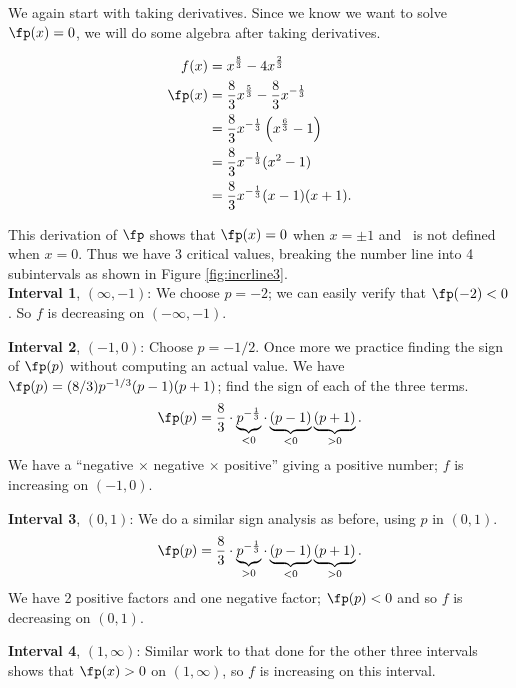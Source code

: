 {We again start with taking derivatives. Since we know we want to solve $\fp(x) = 0$, we will do some algebra after taking derivatives.

\begin{align*}
f(x) &= x^{\frac{8}{3}}-4x^{\frac{2}{3}} \\
\fp(x) &= \frac83 x^{\frac53} - \frac83x^{-\frac13}\\
	&= \frac83x^{-\frac13}\left(x^{\frac63}-1\right)\\
	&=\frac83x^{-\frac13}(x^2-1)\\
	&=\frac83x^{-\frac13}(x-1)(x+1).
\end{align*}

This derivation of $\fp$ shows that $\fp(x) = 0$ when $x=\pm 1$ and \fp\ is not defined when $x=0$. Thus we have 3 critical values, breaking the number line into 4 subintervals as shown in Figure \ref{fig:incrline3}.\\


\noindent\textbf{Interval 1}, $(\infty,-1)$: We choose $p=-2$; we can easily verify that $\fp(-2)<0$. So $f$ is decreasing on $(-\infty,-1)$.

\noindent\textbf{Interval 2}, $(-1,0)$: Choose $p=-1/2$. Once more we practice finding the sign of $\fp(p)$ without computing an actual value. We have $\fp(p) = (8/3)p^{-1/3}(p-1)(p+1)$; find the sign of each of the three terms. 
		$$\fp(p) = \frac 83 \cdot \underbrace{p^{-\frac13}}_{<0}\cdot \underbrace{(p-1)}_{<0}\underbrace{(p+1)}_{>0}.$$
		We have a ``negative $\times$ negative $\times$ positive'' giving a positive number; $f$ is increasing on $(-1,0)$.
		
\noindent\textbf{Interval 3}, $(0,1)$: We do a similar sign analysis as before, using $p$ in $(0,1)$.
		$$\fp(p) = \frac 83 \cdot \underbrace{p^{-\frac13}}_{>0}\cdot \underbrace{(p-1)}_{<0}\underbrace{(p+1)}_{>0}.$$
		We have 2 positive factors and one negative factor; $\fp(p)<0$ and so $f$ is decreasing on $(0,1)$.
		
\noindent\textbf{Interval 4}, $(1,\infty)$: Similar work to that done for the other three intervals shows that $\fp(x)>0$ on $(1,\infty)$, so $f$ is increasing on this interval.\\

}
